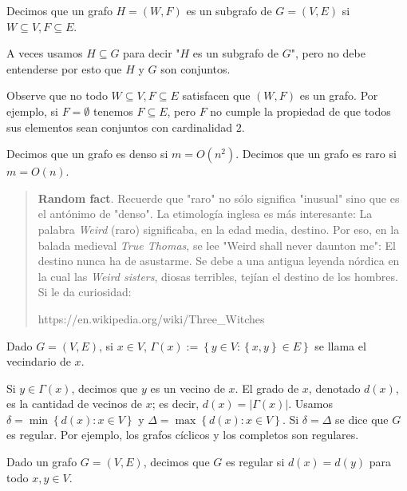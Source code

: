 \documentclass[a4paper, 12pt]{article}
\begin{document}
\begin{definition}
    Decimos que un grafo $H = (W, F)$ es un subgrafo de $G =(V, E)$ si
    $W \subseteq V, F \subseteq E$.
\end{definition}

A veces usamos $H \subseteq G$ para decir "$H$ es un subgrafo de $G$", pero no
debe entenderse por esto que $H$ y $G$ son conjuntos.

Observe que no todo $W \subseteq V, F \subseteq E$ satisfacen que $(W, F)$ es un
grafo. Por ejemplo, si $F = \emptyset$ tenemos $F \subseteq E$, pero $F$
no cumple la propiedad de que todos sus elementos sean conjuntos con cardinalidad $2$.

\begin{definition}[Densidad]
    Decimos que un grafo es denso si $m = O(n^2)$. Decimos que un grafo es raro
    si $m = O(n)$.
\end{definition}


\small
\begin{quote}

\textbf{Random fact}. Recuerde que "raro" no sólo significa "inusual" sino que es el
antónimo de "denso". La etimología inglesa es más interesante:
La palabra \textit{Weird} (raro) significaba, en la edad media, destino. Por
eso, en la balada medieval \textit{True Thomas}, se lee "Weird shall never
daunton me": El destino nunca ha de asustarme. Se debe a una antigua leyenda
nórdica en la cual las \textit{Weird sisters}, diosas terribles, tejían el
destino de los hombres. Si le da curiosidad:

https://en.wikipedia.org/wiki/Three_Witches

\end{quote}
\normalsize

\begin{definition}
    Dado $G = (V, E) $, si $x \in V$, $\Gamma(x) := \left\{ y \in V : \left\{ x,
        y\right\}  \in E
\right\} $ se llama el vecindario de $x$. 
\end{definition}

Si $y \in \Gamma(x)$, decimos que $y$
es un vecino de $x$.  El grado de $x$, denotado $d(x)$, es la cantidad de
vecinos de $x$; es decir, $d(x) = |\Gamma(x)|$.
Usamos $\delta = \min \left\{ d(x) : x \in V \right\} $ y $\Delta = \max \left\{
d(x) : x \in V\right\} $. Si $\delta = \Delta$ se dice que $G$ es regular. Por
ejemplo, los
grafos cíclicos y los completos son regulares.

\begin{definition}
    Dado un grafo $G = (V, E) $, decimos que $G$ es regular si $d(x) = d(y)$
    para todo $x, y \in V$.
\end{definition}
\end{document}
